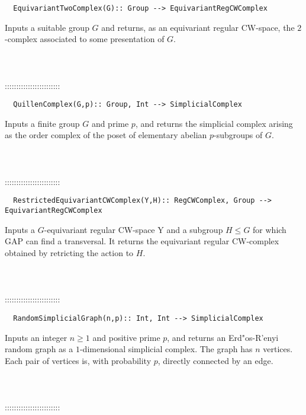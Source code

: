 \documentclass[a4paper,11pt]{report}
\begin{document}
{\begin{verbatim}  EquivariantTwoComplex(G):: Group --> EquivariantRegCWComplex
\end{verbatim}


 

 Inputs a suitable group $G$ and returns, as an equivariant regular CW-space, the $2$-complex associated to some presentation of $G$. \\
 \\
 \\
 \\
 ::::::::::::::::::::::::\\
 
\begin{verbatim}  QuillenComplex(G,p):: Group, Int --> SimplicialComplex
\end{verbatim}


 

 Inputs a finite group $G$ and prime $p$, and returns the simplicial complex arising as the order complex of the poset
of elementary abelian $p$-subgroups of $G$. \\
 \\
 \\
 \\
 ::::::::::::::::::::::::\\
 
\begin{verbatim}  RestrictedEquivariantCWComplex(Y,H):: RegCWComplex, Group --> EquivariantRegCWComplex
\end{verbatim}


 

 Inputs a $G$-equivariant regular CW-space Y and a subgroup $H \le G$ for which GAP can find a transversal. It returns the equivariant regular
CW-complex obtained by retricting the action to $H$. \\
 \\
 \\
 \\
 ::::::::::::::::::::::::\\
 
\begin{verbatim}  RandomSimplicialGraph(n,p):: Int, Int --> SimplicialComplex
\end{verbatim}


 

 Inputs an integer $ n \ge 1 $ and positive prime $p$, and returns an Erd\texttt{}"os-R\texttt{}'enyi random
graph as a $1$-dimensional simplicial complex. The graph has $n$ vertices. Each pair of vertices is, with probability $p$, directly connected by an edge. \\
 \\
 \\
 \\
 ::::::::::::::::::::::::\\
 
}
\end{document}

